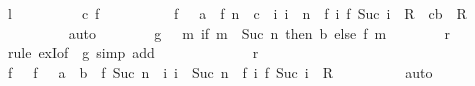 \begin{isabellebody}
\ {\isacharquery}{\kern0pt}l\isanewline
\ \ \ \ \ \ \isamarkupfalse%
\ \isamarkupfalse%
\ c\ f\isanewline
\ \ \ \ \ \ \ \ \ {}{\isacharcolon}{\kern0pt}\ {\isachardoublequoteopen}f\ {}\ {\isacharequal}{\kern0pt}\ a{\isachardoublequoteclose}\ \ {\isachardoublequoteopen}f\ n\ {\isacharequal}{\kern0pt}\ c{\isachardoublequoteclose}\ \ {\isachardoublequoteopen}{\isasymAnd}i{\isachardot}{\kern0pt}\ i\ {\isacharless}{\kern0pt}\ n\ {\isasymLongrightarrow}\ {\isacharparenleft}{\kern0pt}f\ i{\isacharcomma}{\kern0pt}\ f\ {\isacharparenleft}{\kern0pt}Suc\ i{\isacharparenright}{\kern0pt}{\isacharparenright}{\kern0pt}\ {\isasymin}\ R{\isachardoublequoteclose}\ \ {\isachardoublequoteopen}{\isacharparenleft}{\kern0pt}c{\isacharcomma}{\kern0pt}b{\isacharparenright}{\kern0pt}\ {\isasymin}\ R{\isachardoublequoteclose}\isanewline
\ \ \ \ \ \ \ \ \isamarkupfalse%
\ auto\isanewline
\ \ \ \ \ \ \isamarkupfalse%
\ {\isacharquery}{\kern0pt}g\ {\isacharequal}{\kern0pt}\ {\isachardoublequoteopen}{\isasymlambda}\ m{\isachardot}{\kern0pt}\ if\ m\ {\isacharequal}{\kern0pt}\ Suc\ n\ then\ b\ else\ f\ m{\isachardoublequoteclose}\isanewline
\ \ \ \ \ \ \isamarkupfalse%
\ {\isacharquery}{\kern0pt}r\ \isamarkupfalse%
\ {\isacharparenleft}{\kern0pt}rule\ exI{\isacharbrackleft}{\kern0pt}of\ {\isacharunderscore}{\kern0pt}\ {\isacharquery}{\kern0pt}g{\isacharbrackright}{\kern0pt}{\isacharparenright}{\kern0pt}\ {\isacharparenleft}{\kern0pt}simp\ add{\isacharcolon}{\kern0pt}\ {}{\isacharparenright}{\kern0pt}\isanewline
\ \ \ \ \isamarkupfalse%
\isanewline
\ \ \ \ \ \ \isamarkupfalse%
\ {\isacharquery}{\kern0pt}r\isanewline
\ \ \ \ \ \ \isamarkupfalse%
\ \isamarkupfalse%
\ f\ \ {}{\isacharcolon}{\kern0pt}\ {\isachardoublequoteopen}f\ {}\ {\isacharequal}{\kern0pt}\ a{\isachardoublequoteclose}\ \ {\isachardoublequoteopen}b\ {\isacharequal}{\kern0pt}\ f\ {\isacharparenleft}{\kern0pt}Suc\ n{\isacharparenright}{\kern0pt}{\isachardoublequoteclose}\ \ {\isachardoublequoteopen}{\isasymAnd}i{\isachardot}{\kern0pt}\ i\ {\isacharless}{\kern0pt}\ Suc\ n\ {\isasymLongrightarrow}\ {\isacharparenleft}{\kern0pt}f\ i{\isacharcomma}{\kern0pt}\ f\ {\isacharparenleft}{\kern0pt}Suc\ i{\isacharparenright}{\kern0pt}{\isacharparenright}{\kern0pt}\ {\isasymin}\ R{\isachardoublequoteclose}\isanewline
\ \ \ \ \ \ \ \ \isamarkupfalse%
\ auto\isanewline

\end{isabellebody}
